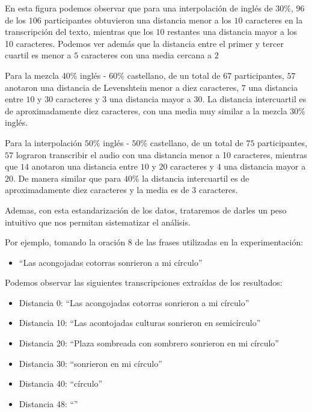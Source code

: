 En esta figura podemos observar que para una interpolación de inglés de $30\%$, $96$ de los $106$ participantes obtuvieron una distancia menor a los $10$ caracteres en la transcripción del texto, mientras que los $10$ restantes una distancia mayor a los 10 caracteres. Podemos ver además que la distancia entre el primer y tercer cuartil es menor a $5$ caracteres con una media cercana a $2$ 

Para la mezcla $40\%$ inglés - $60\%$ castellano, de un total de $67$ participantes, $57$ anotaron una distancia de Levenshtein menor a diez caracteres, $7$ una distancia entre $10$ y $30$ caracteres y $3$ una distancia mayor a $30$. La distancia intercuartil es de aproximadamente diez caracteres, con una media muy similar a la mezcla $30\%$ inglés.

Para la interpolación $50\%$ inglés - $50\%$ castellano, de un total de $75$ participantes, $57$ lograron transcribir el audio con una distancia menor a 10 caracteres, mientras que $14$ anotaron una distancia entre $10$ y $20$ caracteres y $4$ una distancia mayor a $20$. De manera similar que para $40\%$ la distancia intercuartil es de aproximadamente diez caracteres y la media es de $3$ caracteres.

Ademas, con esta estandarización de los datos, trataremos de darles un peso intuitivo que nos permitan sistematizar el análisis.

Por ejemplo, tomando la oración $8$ de las frases utilizadas en la experimentación: 

\begin{itemize}
	\item ``Las acongojadas cotorras sonrieron a mi círculo''
\end{itemize}

Podemos observar las siguientes transcripciones extraídas de los resultados:

\begin{itemize}
	\item Distancia 0: ``Las acongojadas cotorras sonrieron a mi círculo''
	\item Distancia 10: ``Las acontojadas culturas sonrieron en semicírculo''
	\item Distancia 20: ``Plaza sombreada con sombrero sonrieron en mi círculo''
	\item Distancia 30: ``sonrieron en mi círculo''
	\item Distancia 40: ``círculo''
	\item Distancia 48: ``''
\end{itemize}

